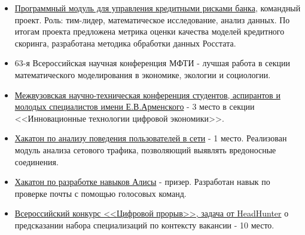 \documentclass[letterpaper,11pt]{article}
\begin{document}
\begin{itemize}
 \item \href{https://github.com/goo-goo-goo-joob/CreditRisks}{Программный модуль для управления кредитными рисками банка}, командный проект. Роль: тим-лидер, математическое исследование, анализ данных. По итогам проекта предложена метрика оценки качества моделей кредитного скоринга, разработана методика обработки данных Росстата.
 \item 63-я Всероссийская научная конференция МФТИ - лучшая работа в секции математического моделирования в экономике,
 экологии и социологии.
 \item \href{https://miem.hse.ru/armntk/winners2020}{Межвузовская научно-техническая конференция студентов, аспирантов и молодых специалистов имени Е.В.Арменского} - 3 место в секции <<Инновационные технологии цифровой экономики>>.
 \item \href{https://yadi.sk/i/5O54Zj2sNvhiLg}{Хакатон по анализу поведения пользователей в сети} - 1 место. Реализован модуль анализа сетового трафика, позволяющий выявлять вредоносные соединения.
  \item \href{https://yandex.ru/blog/dialogs/itogi-onlayn-khakatona-po-razrabotke-navykov-alisy-i-zapis-razbora-navykov}{Хакатон по разработке навыков Алисы} - призер. Разработан навык по проверке почты с помощью голосовых команд.
 \item \href{https://cups.mail.ru/results/leadersofdigital?page_size=18&period=past&round_id=583}{Всероссийский конкурс <<Цифровой прорыв>>, задача от HeadHunter} о предсказании набора специализаций по контексту вакансии - 10 место.
 

\end{itemize}
\end{document}
